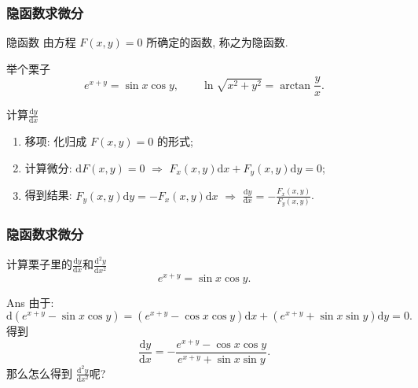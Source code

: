 \documentclass[
10pt,
aspectratio=43,
]{beamer}
\begin{document}
\begin{frame}
	\frametitle{隐函数求微分}
	\everymath{\displaystyle}
	\begin{block}{隐函数}
		由方程 $F(x, y)=0$ 所确定的函数, 称之为隐函数.
	\end{block}
	\pause
	\begin{exampleblock}{举个栗子}
		$$
			e^{x+y}=\sin x\cos y,\qquad \ln \sqrt{x^2+y^2}=\arctan \frac{y}{x}.
		$$
	\end{exampleblock}
	\pause
	\begin{block}{计算$\frac{\mathrm{d}y}{\mathrm{d}x}$}
		\begin{enumerate}
			\item 移项: 化归成 $F(x, y)=0$ 的形式;
			\item 计算微分: $\mathrm{d}F(x,y)=0\,\,\Rightarrow\,\,F_x(x,y)\mathrm{d}x+F_y(x,y)\mathrm{d}y=0$;
			\item 得到结果: $F_y(x,y)\mathrm{d}y=-F_x(x,y)\mathrm{d}x\,\,\Rightarrow\,\,\frac{\mathrm{d}y}{\mathrm{d}x}=-\frac{F_x(x,y)}{F_y(x,y)}$.
		\end{enumerate}
	\end{block}
\end{frame}

\begin{frame}
	\frametitle{隐函数求微分}
	\everymath{\displaystyle}
	\begin{exampleblock}{\color{black}计算栗子里的$\frac{\mathrm{d}y}{\mathrm{d}x}$和$\frac{\mathrm{d}^2y}{\mathrm{d}x^2}$}
		$$
			e^{x+y}=\sin x\cos y.
		$$
	\end{exampleblock}
	\pause
	\begin{block}{Ans}
		由于:
		{\small
		$$
			\mathrm{d}\left(e^{x+y}-\sin x\cos y\right)=\left(e^{x+y}-\cos x\cos y\right)\mathrm{d}x+\left(e^{x+y}+\sin x\sin y\right)\mathrm{d}y=0.
		$$
		}
		得到
		$$
			\frac{\mathrm{d}y}{\mathrm{d}x}=-\frac{e^{x+y}-\cos x\cos y}{e^{x+y}+\sin x\sin y}.
		$$
		那么怎么得到 $\frac{\mathrm{d}^2y}{\mathrm{d}x^2}$呢?
	\end{block}
\end{frame}
\end{document}

